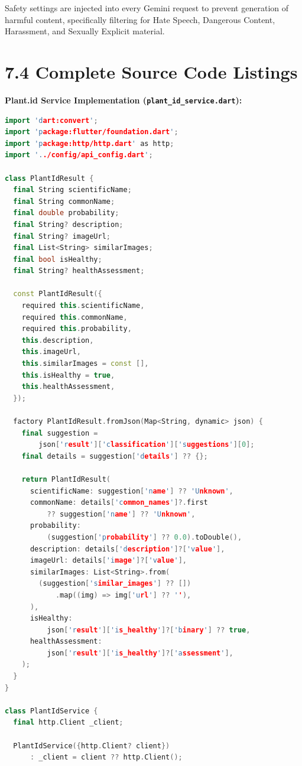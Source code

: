 \documentclass[12pt]{article}
\begin{document}
Safety settings are injected into every Gemini request to prevent generation of harmful content,
specifically filtering for Hate Speech, Dangerous Content, Harassment, and Sexually Explicit
material.

\newpage

\section*{7.4 \quad Complete Source Code Listings}
\justify

\textbf{Plant.id Service Implementation (\texttt{plant\_id\_service.dart}):}
\begin{lstlisting}[language=C++]
import 'dart:convert';
import 'package:flutter/foundation.dart';
import 'package:http/http.dart' as http;
import '../config/api_config.dart';

class PlantIdResult {
  final String scientificName;
  final String commonName;
  final double probability;
  final String? description;
  final String? imageUrl;
  final List<String> similarImages;
  final bool isHealthy;
  final String? healthAssessment;

  const PlantIdResult({
    required this.scientificName,
    required this.commonName,
    required this.probability,
    this.description,
    this.imageUrl,
    this.similarImages = const [],
    this.isHealthy = true,
    this.healthAssessment,
  });

  factory PlantIdResult.fromJson(Map<String, dynamic> json) {
    final suggestion =
        json['result']['classification']['suggestions'][0];
    final details = suggestion['details'] ?? {};

    return PlantIdResult(
      scientificName: suggestion['name'] ?? 'Unknown',
      commonName: details['common_names']?.first
          ?? suggestion['name'] ?? 'Unknown',
      probability:
          (suggestion['probability'] ?? 0.0).toDouble(),
      description: details['description']?['value'],
      imageUrl: details['image']?['value'],
      similarImages: List<String>.from(
        (suggestion['similar_images'] ?? [])
            .map((img) => img['url'] ?? ''),
      ),
      isHealthy:
          json['result']['is_healthy']?['binary'] ?? true,
      healthAssessment:
          json['result']['is_healthy']?['assessment'],
    );
  }
}

class PlantIdService {
  final http.Client _client;

  PlantIdService({http.Client? client})
      : _client = client ?? http.Client();


\end{lstlisting}
\end{document}
